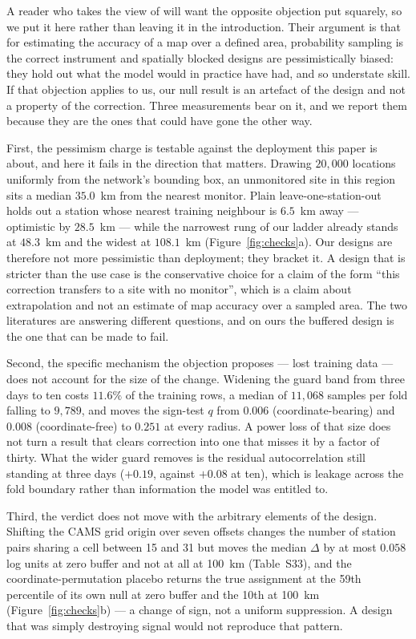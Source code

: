 \documentclass[review,times,authoryear]{elsarticle}
\begin{document}
A reader who takes the view of \citet{wadoux2021} will want the opposite objection put
squarely, so we put it here rather than leaving it in the introduction. Their argument is
that for estimating the accuracy of a map over a defined area, probability sampling is the
correct instrument and spatially blocked designs are pessimistically biased: they hold out
what the model would in practice have had, and so understate skill. If that objection
applies to us, our null result is an artefact of the design and not a property of the
correction. Three measurements bear on it, and we report them because they are the ones
that could have gone the other way.

First, the pessimism charge is testable against the deployment this paper is about, and
here it fails in the direction that matters. Drawing $20{,}000$ locations uniformly from
the network's bounding box, an unmonitored site in this region sits a median $35.0$~km
from the nearest monitor. Plain leave-one-station-out holds out a station whose nearest
training neighbour is $6.5$~km away --- optimistic by $28.5$~km --- while the narrowest
rung of our ladder already stands at $48.3$~km and the widest at $108.1$~km
(Figure~\ref{fig:checks}a). Our designs are therefore not more pessimistic than
deployment; they bracket it. A design that is stricter than the use case is the
conservative choice for a claim of the form ``this correction transfers to a site with no
monitor'', which is a claim about extrapolation and not an estimate of map accuracy over a
sampled area. The two literatures are answering different questions, and on ours the
buffered design is the one that can be made to fail.

Second, the specific mechanism the objection proposes --- lost training data --- does not
account for the size of the change. Widening the guard band from three days to ten costs
$11.6\%$ of the training rows, a median of $11{,}068$ samples per fold falling to
$9{,}789$, and moves the sign-test $q$ from $0.006$ (coordinate-bearing) and $0.008$
(coordinate-free) to $0.251$ at every radius. A power loss of that size does not turn a
result that clears correction into one that misses it by a factor of thirty. What the wider guard removes is the residual
autocorrelation still standing at three days ($+0.19$, against $+0.08$ at ten), which is
leakage across the fold boundary rather than information the model was entitled to.

Third, the verdict does not move with the arbitrary elements of the design. Shifting the
CAMS grid origin over seven offsets changes the number of station pairs sharing a cell
between 15 and 31 but moves the median $\Delta$ by at most $0.058$ log units at zero
buffer and not at all at 100~km (Table~S33), and the coordinate-permutation placebo
returns the true assignment at the 59th percentile of its own null at zero buffer and the
10th at 100~km (Figure~\ref{fig:checks}b) --- a change of sign, not a uniform suppression.
A design that was simply destroying signal would not reproduce that pattern.
\end{document}
